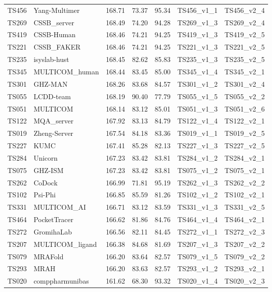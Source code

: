 \begin{longtable}{lllllll}
TS456 & Yang-Multimer & 168.71 & 73.37 & 95.34 & TS456\_v1\_1 & TS456\_v2\_4 \\ 
TS269 & CSSB\_server & 168.49 & 74.20 & 94.28 & TS269\_v1\_3 & TS269\_v2\_4 \\ 
TS419 & CSSB-Human & 168.46 & 74.21 & 94.25 & TS419\_v1\_3 & TS419\_v2\_5 \\ 
TS221 & CSSB\_FAKER & 168.46 & 74.21 & 94.25 & TS221\_v1\_3 & TS221\_v2\_5 \\ 
TS235 & isyslab-hust & 168.45 & 82.62 & 85.83 & TS235\_v1\_3 & TS235\_v2\_5 \\ 
TS345 & MULTICOM\_human & 168.44 & 83.45 & 85.00 & TS345\_v1\_4 & TS345\_v2\_1 \\ 
TS301 & GHZ-MAN & 168.26 & 83.68 & 84.57 & TS301\_v1\_2 & TS301\_v2\_4 \\ 
TS055 & LCDD-team & 168.19 & 90.40 & 77.79 & TS055\_v1\_5 & TS055\_v2\_2 \\ 
TS051 & MULTICOM & 168.14 & 83.12 & 85.01 & TS051\_v1\_3 & TS051\_v2\_6 \\ 
TS122 & MQA\_server & 167.92 & 83.13 & 84.79 & TS122\_v1\_4 & TS122\_v2\_1 \\ 
TS019 & Zheng-Server & 167.54 & 84.18 & 83.36 & TS019\_v1\_1 & TS019\_v2\_5 \\ 
TS227 & KUMC & 167.41 & 85.28 & 82.13 & TS227\_v1\_3 & TS227\_v2\_5 \\ 
TS284 & Unicorn & 167.23 & 83.42 & 83.81 & TS284\_v1\_2 & TS284\_v2\_1 \\ 
TS075 & GHZ-ISM & 167.23 & 83.42 & 83.81 & TS075\_v1\_2 & TS075\_v2\_1 \\ 
TS262 & CoDock & 166.99 & 71.81 & 95.19 & TS262\_v1\_3 & TS262\_v2\_2 \\ 
TS102 & Psi-Phi & 166.85 & 85.59 & 81.26 & TS102\_v1\_2 & TS102\_v2\_1 \\ 
TS331 & MULTICOM\_AI & 166.71 & 83.12 & 83.59 & TS331\_v1\_3 & TS331\_v2\_5 \\ 
TS464 & PocketTracer & 166.62 & 81.86 & 84.76 & TS464\_v1\_4 & TS464\_v2\_1 \\ 
TS272 & GromihaLab & 166.56 & 82.11 & 84.45 & TS272\_v1\_1 & TS272\_v2\_3 \\ 
TS207 & MULTICOM\_ligand & 166.38 & 84.68 & 81.69 & TS207\_v1\_3 & TS207\_v2\_2 \\ 
TS079 & MRAFold & 166.20 & 83.64 & 82.57 & TS079\_v1\_5 & TS079\_v2\_2 \\ 
TS293 & MRAH & 166.20 & 83.63 & 82.57 & TS293\_v1\_2 & TS293\_v2\_1 \\ 
TS020 & comppharmunibas & 161.62 & 68.30 & 93.32 & TS020\_v1\_4 & TS020\_v2\_3 \\ 

\end{longtable}
